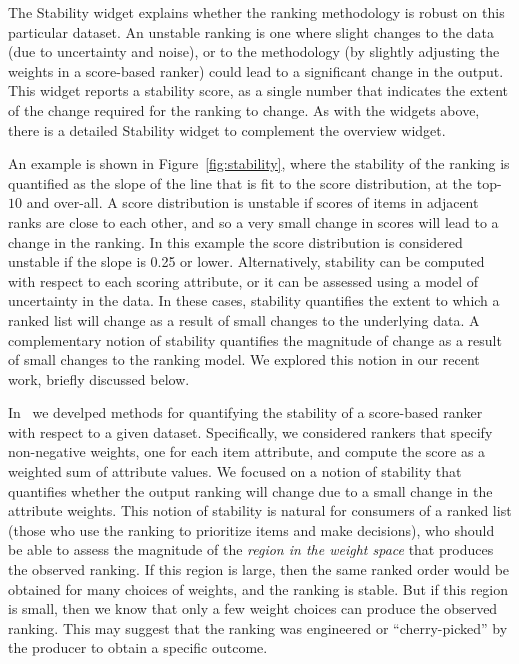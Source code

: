 The {\sf Stability} widget explains whether the ranking methodology is robust on this particular dataset.  An unstable ranking is one where slight changes to the data (\eg due to uncertainty and noise), or to the methodology (\eg by slightly adjusting the weights in a score-based ranker) could lead to a significant change in the output. This widget reports a stability score, as a single number that indicates the extent of the change required for the ranking to change.  As with the widgets above, there is a detailed {\sf Stability} widget to complement the overview widget.  

An example is shown in Figure~\ref{fig:stability}, where the stability of the ranking is quantified as the slope of the line that is fit to the score distribution, at the top-$10$ and over-all.  A score distribution is unstable if scores of items in adjacent ranks are close to each other, and so a very small change in scores will lead to a change in the ranking.  In this example the score distribution is considered unstable if the slope is 0.25 or lower.  Alternatively, stability can be computed with respect to each scoring attribute, or it can be assessed using a model of uncertainty in the data.  In these cases, stability quantifies the extent to which a ranked list will change as a result of small changes to the underlying data.  A complementary notion of stability quantifies the magnitude of change as a result of small changes to the ranking model.  We explored this notion in our recent work, briefly discussed below.

In~\cite{DBLP:journals/pvldb/AsudehJMS18} we develped methods for quantifying the stability of a score-based ranker with respect to a given dataset.  Specifically, we considered rankers that specify non-negative weights, one for each item attribute, and compute the score as a weighted sum of attribute values. We focused on a notion of stability that quantifies whether the output ranking will change due to a small change in the attribute weights.  This notion of stability is  natural  for consumers of a ranked list (\ie those who use the ranking to prioritize items and make decisions), who should be able to assess the magnitude of the {\em region in the weight space} that produces the observed ranking.  If this region is large, then the same ranked order would be obtained for many choices of weights, and the ranking is stable.  But if this region is small, then we know that only a few weight choices can produce the observed ranking.  This may suggest that the ranking was engineered or ``cherry-picked'' by the producer to obtain a specific outcome.

